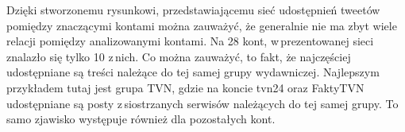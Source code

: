 Dzięki stworzonemu rysunkowi, przedstawiającemu sieć udostępnień tweetów pomiędzy znaczącymi kontami można zauważyć, że generalnie nie ma zbyt wiele relacji pomiędzy analizowanymi kontami. Na 28 kont, w\,prezentowanej sieci znalazło się tylko 10 z\,nich. Co można zauważyć, to fakt, że najczęściej udostępniane są treści należące do tej samej grupy wydawniczej. Najlepszym przykładem tutaj jest grupa TVN, gdzie na koncie tvn24 oraz FaktyTVN udostępniane są posty z\,siostrzanych serwisów należących do tej samej grupy. To samo zjawisko występuje również dla pozostałych kont. 
